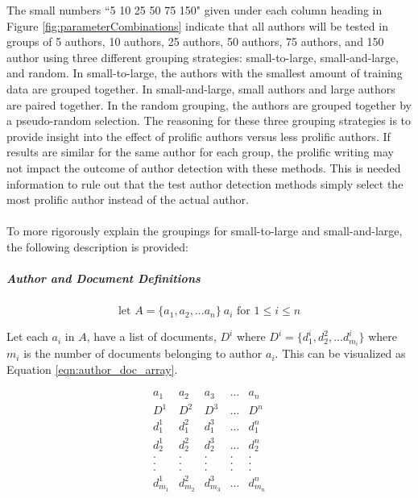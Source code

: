 The small numbers ``5 10 25 50 75 150" given under each column heading in Figure \ref{fig:parameterCombinations} indicate that all authors will be tested in groups of 5 authors, 10 authors, 25 authors, 50 authors, 75 authors, and 150 author using three different grouping strategies: small-to-large, small-and-large, and random. In small-to-large, the authors with the smallest amount of training data are grouped together.  In small-and-large, small authors and large authors are paired together.  In the random grouping, the authors are grouped together by a pseudo-random selection.  The reasoning for these three grouping strategies is to provide insight into the effect of prolific authors versus less prolific authors.  If results are similar for the same author for each group, the prolific writing may not impact the outcome of author detection with these methods.  This is needed information to rule out that the test author detection methods simply select the most prolific author instead of the actual author.

\paragraph*{} To more rigorously explain the groupings for small-to-large and small-and-large, the following description is provided:
	
	\subparagraph*{Author and Document Definitions}
	\begin{equation} \text{let } A = \{ a_1, a_2, ... a_n \} \medspace  a_i \text{ for } 1 \le i \le n \end{equation}
	
	Let each $a_i$ in $A$, have a list of documents, $D^i$ where $D^i = \{ d_1^i, d_2^2, ... d_{m_i}^i \}$ where $m_i$ is the number of documents belonging to author $a_i$.  This can be visualized as Equation \eqref{eqn:author_doc_array}.
	
	\begin{equation}\label{eqn:author_doc_array}
	\begin{array}{lllll}
	a_1 		& a_2 		& a_3 		& ... 	& a_n		\\
	D^1 		& D^2 		& D^3 		& ... 	& D^n		\\
	d_1^1 		& d_1^2		& d_1^3		& ...	& d_1^n		\\
	d_2^1		& d_2^2		& d_2^3		& ...	& d_2^n		\\
	.		& .		& .		& .	& . 		\\
	.		& .		& .		& .	& .		\\
	.		& .		& .		& .	& .		\\
	d_{m_1}^1	& d_{m_2}^2	& d_{m_3}^3	& ...	& d_{m_n}^n	\\
	\end{array}
	\end{equation}
	
